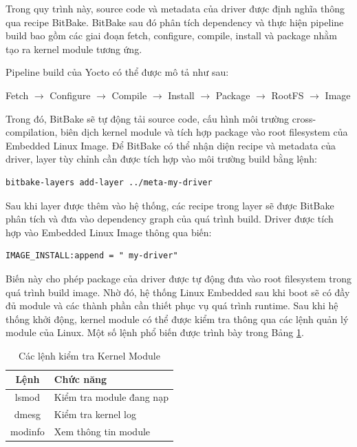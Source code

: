 Trong quy trình này, source code và metadata của driver được định nghĩa thông qua recipe BitBake. BitBake sau đó phân tích dependency và thực hiện pipeline build bao gồm các giai đoạn fetch, configure, compile, install và package nhằm tạo ra kernel module tương ứng.

Pipeline build của Yocto có thể được mô tả như sau:

\begin{flushleft}
\small
Fetch $\rightarrow$ Configure $\rightarrow$ Compile $\rightarrow$ Install $\rightarrow$ Package $\rightarrow$ RootFS $\rightarrow$ Image
\end{flushleft}

Trong đó, BitBake sẽ tự động tải source code, cấu hình môi trường cross-compilation, biên dịch kernel module và tích hợp package vào root filesystem của Embedded Linux Image. Để BitBake có thể nhận diện recipe và metadata của driver, layer tùy chỉnh cần được tích hợp vào môi trường build bằng lệnh:

\begin{verbatim}
bitbake-layers add-layer ../meta-my-driver
\end{verbatim}

Sau khi layer được thêm vào hệ thống, các recipe trong layer sẽ được BitBake phân tích và đưa vào dependency graph của quá trình build. Driver được tích hợp vào Embedded Linux Image thông qua biến:

\begin{verbatim}
IMAGE_INSTALL:append = " my-driver"
\end{verbatim}

Biến này cho phép package của driver được tự động đưa vào root filesystem trong quá trình build image. Nhờ đó, hệ thống Linux Embedded sau khi boot sẽ có đầy đủ module và các thành phần cần thiết phục vụ quá trình runtime. Sau khi hệ thống khởi động, kernel module có thể được kiểm tra thông qua các lệnh quản lý module của Linux. Một số lệnh phổ biến được trình bày trong Bảng \ref{tab:runtime_verify_commands}.

\begin{table}[H]
\centering
\begin{tabular}{|c|l|}
\hline
Lệnh & Chức năng \\ \hline
lsmod & Kiểm tra module đang nạp \\ \hline
dmesg & Kiểm tra kernel log \\ \hline
modinfo & Xem thông tin module \\ \hline
\end{tabular}
\caption{Các lệnh kiểm tra Kernel Module}
\label{tab:runtime_verify_commands}
\end{table}

